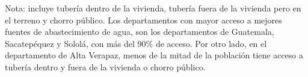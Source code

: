 Nota: incluye tubería dentro de la vivienda, tubería fuera de la vivienda pero en el terreno y chorro público. Los departamentos con mayor acceso a mejores fuentes de abastecimiento de agua, son los departamentos de Guatemala, Sacatepéquez y Sololá, con más del 90\% de acceso. Por otro lado, en el departamento de Alta Verapaz, menos de la mitad de la población tiene acceso a tubería dentro y fuera de la vivienda o  chorro público.
